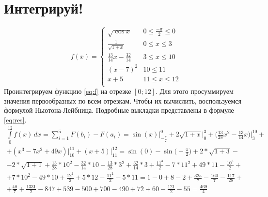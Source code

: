 \documentclass[30pt]{article}
\begin{document}
    \section{Интегрируй!}
        \begin{equation}
            f(x) = \begin{cases}
                \sqrt{\cos{x}} & 0 \leqslant \frac{-\pi}{2} \leqslant 0 \\
                \frac{1}{\sqrt{1 + x}} & 0 \leqslant x \leqslant 3 \\
                \frac{13}{14}x - \frac{32}{14} & 3 \leqslant x \leqslant 10 \\
                (x - 7)^2 & 10 \leqslant  11 \\
                x + 5 & 11 \leqslant x \leqslant 12 \\
            \end{cases}
            \label{eq:f}
        \end{equation}
        Проинтегрируем функцию \ref{eq:f} на отрезке $[0;12]$. Для этого просуммируем значения первообразных по всем отрезкам. Чтобы их вычислить, воспользуемся формулой Ньютона-Лейбница. Подробные выкладки представлены в формуле \ref{eq:res}. 
        \begin{multline}
            \int \limits_{0}^{12} f(x)\,dx = \sum \limits_{i = 1}^{5} F(b_i) - F(a_i) = \sin(x)\bigg|_{-\frac{\pi}{2}}^{0} + 2 \sqrt{1 + x}\bigg|_{0}^{3} + \bigg(\frac{13}{28}x^2 - \frac{13}{14}x\bigg)\bigg|_{3}^{10} + \\
            + (x^3 - 7x ^ 2 + 49x)\bigg|_{10}^{11} + (x + 5)\bigg|_{11}^{12} =  \sin(0) - \sin\bigg(-\frac{\pi}{2}\bigg) + 2 * \sqrt{1 + 3} - \\
            -2 * \sqrt{1 + 1} + \frac{13}{28} * 10^2 - \frac{32}{14}*10 - \frac{13}{28} * 3^2 + \frac{32}{14} * 3 + \frac{11^3}{2} - 7 * 11^2 + 49 * 11 - \frac{10^3}{2} + \\
            + 7 * 10^2 - 49 * 10 + \frac{12^2}{2} + 5 * 12 - \frac{11^2}{2} - 5 * 11 = 1 - 0 + 8 - 2 + \frac{325}{7} - \frac{160}{7} - \frac{117}{28} + \\
            + \frac{48}{7} + \frac{1331}{2} - 847 + 539 - 500 + 700 - 490 + 72 + 60 - \frac{121}{2} - 55 = \frac{469}{4}
            \label{eq:res}
        \end{multline}
\end{document}
